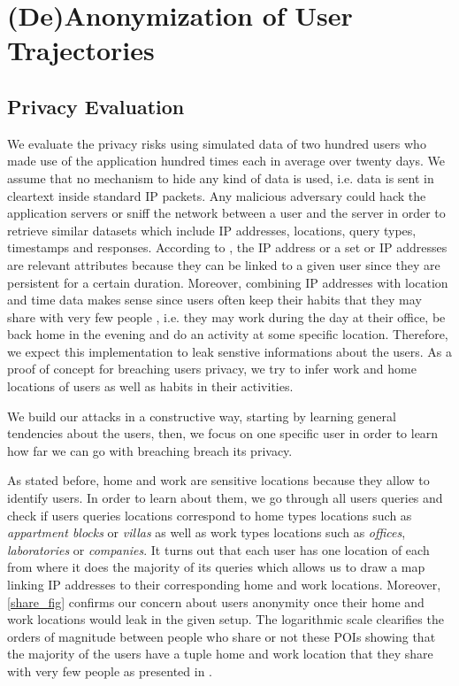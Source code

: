 \documentclass[10pt,conference,compsocconf]{IEEEtran}
\begin{document}
\section{(De)Anonymization of User Trajectories}

\subsection{Privacy Evaluation}
We evaluate the privacy risks using simulated data of two hundred users who made use of the application hundred times each in average over twenty days. We assume that no mechanism to hide any kind of data is used, i.e. data is sent in cleartext inside standard IP packets. Any malicious adversary could hack the application servers or sniff the network between a user and the server in order to retrieve similar datasets which include IP addresses, locations, query types, timestamps and responses. According to \cite{dont}, the IP address or a set or IP addresses are relevant attributes because they can be linked to a given user since they are persistent for a certain duration. Moreover, combining IP addresses with location and time data makes sense since users often keep their habits that they may share with very few people \cite{on}, i.e. they may work during the day at their office, be back home in the evening and do an activity at some specific location. Therefore, we expect this implementation to leak senstive informations about the users. As a proof of concept for breaching users privacy, we try to infer work and home locations of users as well as habits in their activities.

We build our attacks in a constructive way, starting by learning general tendencies about the users, then, we focus on one specific user in order to learn how far we can go with breaching breach its privacy.

As stated before, home and work are sensitive locations because they allow to identify users. In order to learn about them, we go through all users queries and check if users queries locations correspond to home types locations such as \textit{appartment blocks} or \textit{villas} as well as work types locations such as \textit{offices}, \textit{laboratories} or \textit{companies}. It turns out that each user has one location of each from where it does the majority of its queries which allows us to draw a map linking IP addresses to their corresponding home and work locations. Moreover, \ref{share_fig} confirms our concern about users anonymity once their home and work locations would leak in the given setup. The logarithmic scale clearifies the orders of magnitude between people who share or not these POIs showing that the majority of the users have a tuple home and work location that they share with very few people as presented in \cite{on}.
\end{document}
